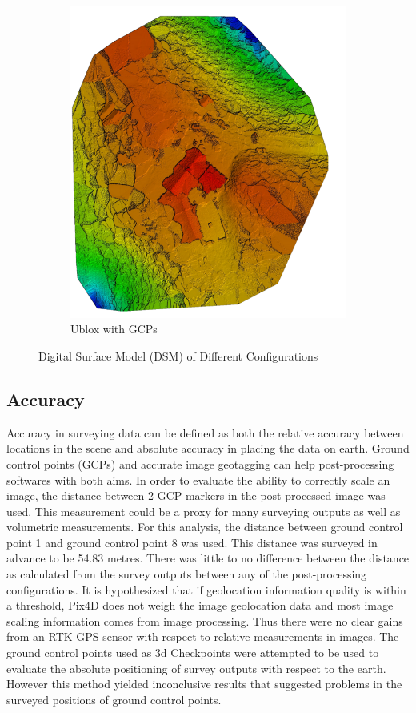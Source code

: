 \documentclass{article}
\begin{document}
\begin{figure}
\begin{subfigure}{.33\textwidth}
  \includegraphics[width=.72\linewidth]{images/DSM/ublox_gcp.png}
  \caption{Ublox with GCPs}
  \label{fig:sub1}
\end{subfigure}%
\caption{Digital Surface Model (DSM) of Different Configurations}
\label{dem}
\end{figure}

\subsection{Accuracy}

Accuracy in surveying data can be defined as both the relative accuracy between locations in the scene
and absolute accuracy in placing the data on earth. Ground control points (GCPs) and accurate image geotagging can help post-processing softwares with both aims.
In order to evaluate the ability to correctly scale an image, the distance between 2 GCP markers in
the post-processed image was used.  This measurement could be a proxy for many surveying outputs
as well as volumetric measurements.  For this analysis, the distance between ground control point
1 and ground control point 8 was used.  This distance was surveyed in advance to be 54.83
metres. There was little to no difference between the distance as calculated from the survey outputs
between any of the post-processing configurations. It is hypothesized that if geolocation information quality is within a threshold, Pix4D does not weigh the image geolocation data and most image scaling information comes from image processing.  Thus there were no clear gains from an RTK GPS sensor with respect to relative measurements in images.
The ground control points used as 3d Checkpoints were attempted to be used to evaluate the absolute positioning of survey outputs with respect to the earth.  However this method yielded inconclusive results that suggested problems in the surveyed positions of ground control points.
\end{document}
